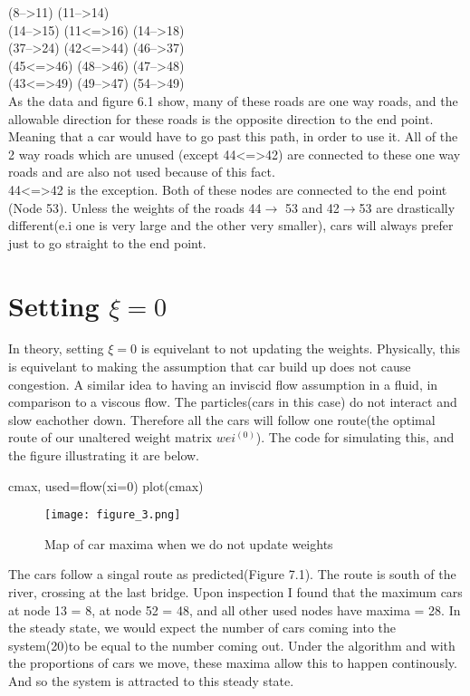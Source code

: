 \documentclass[paper=a4, fontsize=12pt]{scrartcl} %
\numberwithin{equation}{section}       %
\numberwithin{figure}{section}         %
\numberwithin{table}{section}          %
\begin{document}
(8-->11)
(11-->14)
\\(14-->15)
(11<=>16)
(14-->18)
\\(37-->24)
(42<=>44)
(46-->37)
\\(45<=>46)
(48-->46)
(47-->48)
\\(43<=>49)
(49-->47)
(54-->49)
\\As the data and figure 6.1 show, many of these roads are one way roads, and the allowable direction for these roads is the opposite direction to the end point. Meaning that a car would have to go past this path, in order to use it. All of the 2 way roads which are unused (except 44<=>42) are connected to these one way roads and are also not used because of this fact. 
\\44<=>42 is the exception. Both of these nodes are connected to the end point (Node 53). Unless the weights of the roads 44$\rightarrow$ 53 and 42$\rightarrow$53 are drastically different(e.i one is very large and the other very smaller), cars will always prefer just to go straight to the end point.

\section{Setting $\xi=0$}
In theory, setting $\xi =0$ is equivelant to not updating the weights. Physically, this is equivelant to making the assumption that car build up does not cause congestion. A similar idea to having an inviscid flow assumption in a fluid, in comparison to a viscous flow. The particles(cars in this case) do not interact and slow eachother down. Therefore all the cars will follow one route(the optimal route of our unaltered weight matrix $wei^{(0)}$). The code for simulating this, and the figure illustrating it are below. 
\begin{python}
    cmax, used=flow(xi=0)
    plot(cmax)
\end{python}
\begin{figure}[H]
	\centering
	\texttt{[image: figure\_3.png]}
	\caption{Map of car maxima when we do not update weights}
	\label{fig:myfigure3}
\end{figure}
The cars follow a singal route as predicted(Figure 7.1). The route is south of the river, crossing at the last bridge. Upon inspection I found that the maximum cars at node 13 = 8, at node 52 = 48, and all other used nodes have maxima = 28. In the steady state, we would expect the number of cars coming into the system(20)to be equal to the number coming out. Under the algorithm and with the proportions of cars we move, these maxima allow this to happen continously. And so the system is attracted to this steady state. 
\end{document}
